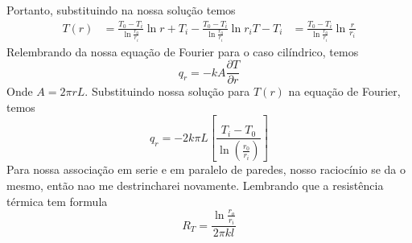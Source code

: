 Portanto, substituindo na nossa solução temos
\begin{align}
    T(r) &= \frac{T_0 - T_i}{\ln \frac{r_0}{r_i}} \ln r + T_i - \frac{T_0 - T_i}{\ln \frac{r_0}{r_i}} \ln r_i
    T - T_i &= \frac{T_0 - T_i}{\ln \frac{r_0}{r_i}} \ln \frac{r}{r_i}
\end{align}
Relembrando da nossa equação de Fourier para o caso cilíndrico, temos
\begin{equation}
    q_r = - k A \frac{\partial T}{\partial r}
\end{equation}
Onde \(A = 2 \pi r L\). Substituindo nossa solução para \(T(r)\) na equação de Fourier, temos
\begin{equation}
    q_r = - 2 k \pi L \left[\frac{T_i - T_0}{\ln \left(\frac{r_0}{r_i}\right)}\right]
\end{equation}
Para nossa associação em serie e em paralelo de paredes, nosso raciocínio se da o mesmo, então nao
me destrincharei novamente. Lembrando que a resistência térmica tem formula
\begin{equation}
    R_T = \frac{\ln \frac{r_o}{r_i}  }{2\pi k l} 
\end{equation}
